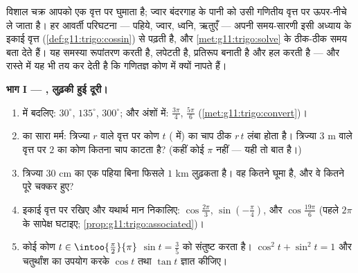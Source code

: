 \begin{problem}
\label{pb:g11:trigo:1}
विशाल चक्र आपको एक वृत्त पर घुमाता है; ज्वार बंदरगाह के पानी को उसी गणितीय
वृत्त पर ऊपर-नीचे ले जाता है। हर आवर्ती परिघटना --- पहिये, ज्वार, ध्वनि,
ऋतुएँ --- अपनी समय-सारणी इसी अध्याय के इकाई वृत्त (\cref{def:g11:trigo:cossin}) से पढ़ती है, और
\cref{met:g11:trigo:solve} के  ठीक-ठीक समय बता देते हैं। यह समस्या रूपांतरण करती है, लपेटती
है, प्रतिरूप बनाती है और हल करती है --- और रास्ते में यह भी तय कर देती है कि
गणितज्ञ कोण  में क्यों नापते हैं।

\medskip
\noindent\textbf{भाग I --- , लुढ़की हुई दूरी।}
\begin{enumerate}
  \item {} में बदलिए: $30^\circ$, $135^\circ$, $300^\circ$; और अंशों में: $\frac{3\pi}{4}$, $\frac{5\pi}{6}$
        (\cref{met:g11:trigo:convert})।
  \item {} का सारा मर्म: त्रिज्या $r$ वाले वृत्त पर कोण $t$ (
        में) का चाप ठीक $r\,t$ लंबा होता है। त्रिज्या $3$ m वाले वृत्त पर
        $2$  का कोण कितना चाप काटता है? (कहीं कोई $\pi$ नहीं ---
        यही तो बात है।)
  \item त्रिज्या $30$ cm का एक पहिया बिना फिसले $1$ km लुढ़कता है। वह
        कितने \emph{} घूमा है, और वे कितने पूरे चक्कर हुए?
  \item इकाई वृत्त पर रखिए और यथार्थ मान निकालिए: $\cos\frac{2\pi}{3}$, $\sin\left(-\frac{\pi}{4}\right)$, और $\cos\frac{19\pi}{6}$
        (पहले $2\pi$ के सापेक्ष घटाइए; \cref{prop:g11:trigo:associated})।
  \item कोई कोण $t \in \intoo{\frac\pi2}{\pi}$ $\sin t = \frac35$ को संतुष्ट करता है। $\cos^2 t + \sin^2 t = 1$ और चतुर्थांश का
        उपयोग करके $\cos t$ तथा $\tan t$ ज्ञात कीजिए।
\end{enumerate}


\end{problem}
